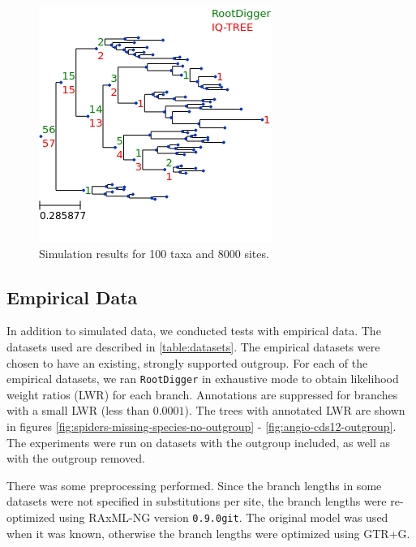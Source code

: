 \documentclass{article}
\newcommand{\RootDiggertt}{\texttt{RootDigger}}
\begin{document}
\begin{figure}
  \includegraphics{figs/sim_results/50_8000.png}
  \caption{Simulation results for 100 taxa and 8000
  sites. \label{fig:sim-results-50t-8000s}}
\end{figure}

\subsection{Empirical Data}

In addition to simulated data, we conducted tests with empirical data. The
datasets used are described in \ref{table:datasets}.
The empirical datasets were chosen to have an existing, strongly supported
outgroup.
For each of the empirical datasets, we ran \RootDiggertt{} in exhaustive mode to
obtain likelihood weight ratios (LWR) for each branch.
Annotations are suppressed for branches with a small LWR (less than $0.0001$).
The trees with annotated LWR are shown in figures
\ref{fig:spiders-missing-species-no-outgroup} - \ref{fig:angio-cds12-outgroup}.
The experiments were run on datasets with the outgroup included, as well as
with the outgroup removed.

There was some preprocessing performed. Since the branch lengths in some
datasets were not specified in substitutions per site, the branch lengths were
re-optimized using RAxML-NG \cite{kozlov_raxml-ng:_2019} version
\texttt{0.9.0git}. The original model was used when it was known, otherwise the
branch lengths were optimized using GTR+G.

\begin{table}[H]
  \begin{center}
    
    \label{table:datasets}
  \end{center}
\end{table}
\end{document}
